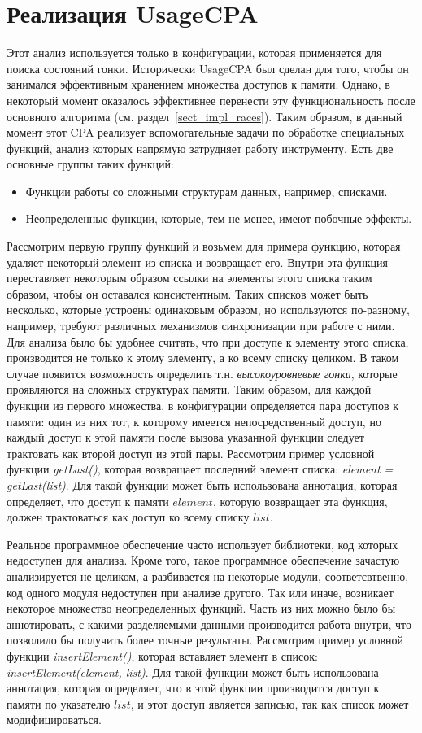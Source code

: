 \section{Реализация UsageCPA}
\label{sect_impl_usage}
Этот анализ используется только в конфигурации, которая применяется для поиска состояний гонки.
Исторически UsageCPA был сделан для того, чтобы он занимался эффективным хранением множества доступов к памяти.
Однако, в некоторый момент оказалось эффективнее перенести эту функциональность после основного алгоритма (см. раздел~\ref{sect_impl_races}).
Таким образом, в данный момент этот CPA реализует вспомогательные задачи по обработке специальных функций, анализ которых напрямую затрудняет работу инструменту.
Есть две основные группы таких функций:
\begin{itemize}
\item Функции работы со сложными структурам данных, например, списками.
\item Неопределенные функции, которые, тем не менее, имеют побочные эффекты.
\end{itemize}

Рассмотрим первую группу функций и возьмем для примера функцию, которая удаляет некоторый элемент из списка и возвращает его.
Внутри эта функция переставляет некоторым образом ссылки на элементы этого списка таким образом, чтобы он оставался консистентным.
Таких списков может быть несколько, которые устроены одинаковым образом, но используются по-разному, например, требуют различных механизмов синхронизации при работе с ними. 
Для анализа было бы удобнее считать, что при доступе к элементу этого списка, производится не только к этому элементу, а ко всему списку целиком. 
В таком случае появится возможность определить т.н. \textit{высокоуровневые гонки}, которые проявляются на сложных структурах памяти.
Таким образом, для каждой функции из первого множества, в конфигурации определяется пара доступов к памяти: один из них тот, к которому имеется непосредственный доступ, но каждый доступ к этой памяти после вызова указанной функции следует трактовать как второй доступ из этой пары.
Рассмотрим пример условной функции \textit{getLast()}, которая возвращает последний элемент списка: \textit{element = getLast(list)}.
Для такой функции может быть использована аннотация, которая определяет, что доступ к памяти $element$, которую возвращает эта функция, должен трактоваться как доступ ко всему списку $list$. 

Реальное программное обеспечение часто использует библиотеки, код которых недоступен для анализа.
Кроме того, такое программное обеспечение зачастую анализируется не целиком, а разбивается на некоторые модули, соответсвтвенно, код одного модуля недоступен при анализе другого.
Так или иначе, возникает некоторое множество неопределенных функций.
Часть из них можно было бы аннотировать, с какими разделяемыми данными производится работа внутри, что позволило бы получить более точные результаты.
Рассмотрим пример условной функции \textit{insertElement()}, которая вставляет элемент в список: \textit{insertElement(element, list)}.
Для такой функции может быть использована аннотация, которая определяет, что в этой функции производится доступ к памяти по указателю $list$, и этот доступ является записью, так как список может модифицироваться.


